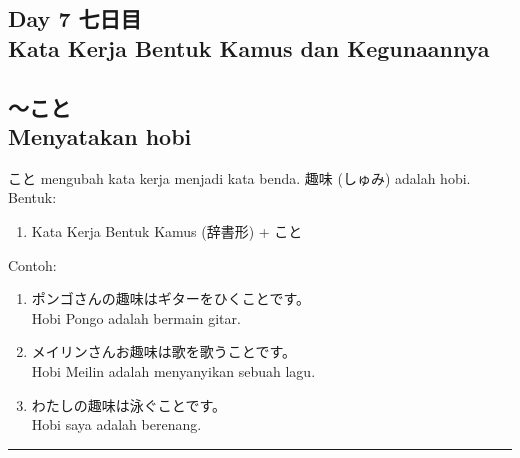\begin{flushright}
    \section*{\Large{Day 7 七日目 \\
    Kata Kerja Bentuk Kamus dan Kegunaannya}}
\end{flushright}

\subsection*{
    ～こと \\ 
    Menyatakan hobi
}
こと mengubah kata kerja menjadi kata benda. 趣味 (しゅみ) adalah hobi.\\
Bentuk:
\begin{enumerate}
    \item Kata Kerja Bentuk Kamus (辞書形) + こと
\end{enumerate}
Contoh: 
\begin{enumerate}
    \item ポンゴさんの趣味はギターをひくことです。
    \\ Hobi Pongo adalah bermain gitar.
    \item メイリンさんお趣味は歌を歌うことです。
    \\ Hobi Meilin adalah menyanyikan sebuah lagu.
    \item わたしの趣味は泳ぐことです。
    \\ Hobi saya adalah berenang.
\end{enumerate}

\vspace{0.2cm}\hrule height 1pt\vspace{0.2cm}


